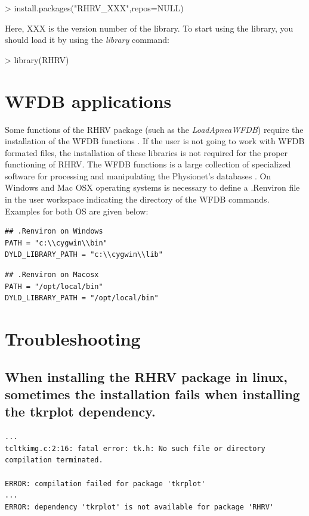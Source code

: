 \documentclass[12pt,lot, lof]{puthesis}
\begin{document}
\begin{Schunk}
\begin{Sinput}
> install.packages("RHRV_XXX",repos=NULL)
\end{Sinput}
\end{Schunk}
Here, XXX is the version number of the library. To start using the library, you 
should load it by using the \textit{library} command:
\begin{Schunk}
\begin{Sinput}
> library(RHRV)
\end{Sinput}
\end{Schunk}

\section{WFDB applications} Some functions of the RHRV package (such as the 
\textit{LoadApneaWFDB}) require the installation of the WFDB functions 
\cite{moody2003wfdb}. If the user is not going to work with WFDB formated 
files, the installation of these libraries is not required for the proper 
functioning of RHRV. The WFDB functions is a large collection of specialized 
software for processing and manipulating the Physionet's databases 
\cite{physioNet}. On Windows and Mac OSX operating systems is necessary to 
define
a .Renviron file in the user workspace indicating the directory
of the WFDB commands. Examples for both OS are given below: 
\begin{verbatim}
## .Renviron on Windows
PATH = "c:\\cygwin\\bin"
DYLD_LIBRARY_PATH = "c:\\cygwin\\lib"
\end{verbatim}

\begin{verbatim}
## .Renviron on Macosx
PATH = "/opt/local/bin"
DYLD_LIBRARY_PATH = "/opt/local/bin"
\end{verbatim}


\section{Troubleshooting} 
\subsection[tkrplot dependency]{When installing the RHRV package in linux, 
sometimes the installation fails when installing the tkrplot dependency.}
\begin{verbatim}
...
tcltkimg.c:2:16: fatal error: tk.h: No such file or directory
compilation terminated.

ERROR: compilation failed for package 'tkrplot'
...
ERROR: dependency 'tkrplot' is not available for package 'RHRV'
\end{verbatim}
\end{document}
